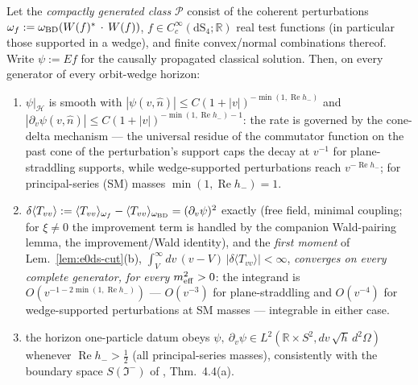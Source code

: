\begin{lemma}
\label{lem:ds2-moment}
Let the \emph{compactly generated class} $\mathcal P$ consist of the
coherent perturbations $\omega_f:=\omega_{\rm
BD}(W(f)^*\,\cdot\,W(f))$, $f\in C^\infty_c(\mathrm{dS}_4;\mathbb
R)$ real test functions (in particular those supported in a wedge),
and finite convex/normal combinations thereof. Write $\psi:=Ef$ for
the causally propagated classical solution. Then, on every generator
of every orbit-wedge horizon:
\begin{enumerate}
\item[(i)] $\psi|_{\mathcal H}$ is smooth with
  $|\psi(v,\hat n)|\le C(1+|v|)^{-\min(1,\operatorname{Re}h_-)}$ and
  $|\partial_v\psi(v,\hat n)|\le
  C(1+|v|)^{-\min(1,\operatorname{Re}h_-)-1}$: the rate is governed
  by the cone-delta mechanism --- the universal residue of the
  commutator function on the past cone of the perturbation's support
  caps the decay at $v^{-1}$ for plane-straddling supports, while
  wedge-supported perturbations reach $v^{-\operatorname{Re}h_-}$;
  for principal-series (SM) masses $\min(1,\operatorname{Re}h_-)=1$.
\item[(ii)] $\delta\langle T_{vv}\rangle:=\langle
  T_{vv}\rangle_{\omega_f}-\langle T_{vv}\rangle_{\omega_{\rm
  BD}}=(\partial_v\psi)^2$ exactly (free field, minimal coupling;
  for $\xi\neq0$ the improvement term is handled by the companion
  Wald-pairing lemma, the improvement/Wald identity), and the \emph{first
  moment} of Lem.~\ref{lem:e0ds-cut}(b),
  $\int^{\infty}_{V}dv\,(v-V)\,|\delta\langle
  T_{vv}\rangle|<\infty$, \emph{converges on every complete
  generator, for every $m^2_{\rm eff}>0$}: the integrand is
  $O(v^{-1-2\min(1,\operatorname{Re}h_-)})$ --- $O(v^{-3})$ for
  plane-straddling and $O(v^{-4})$ for wedge-supported perturbations
  at SM masses --- integrable in either case.
\item[(iii)] the horizon one-particle datum obeys $\psi,\ 
  \partial_v\psi\in L^2(\mathbb R\times S^2,dv\,\sqrt h\,d^2\Omega)$
  whenever $\operatorname{Re}h_->\tfrac12$ (all principal-series
  masses), consistently with the boundary space $S(\Im^-)$ of
  \cite{DappiaggiMorettiPinamonti2009}, Thm.~4.4(a).
\end{enumerate}
\end{lemma}

